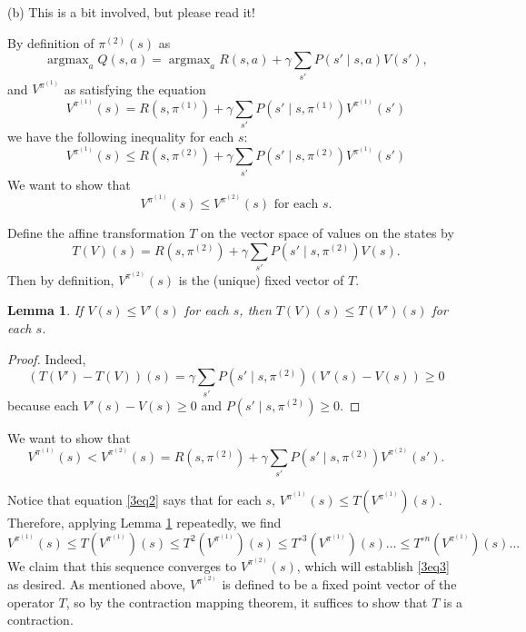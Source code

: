 \documentclass[12pt]{article}
\DeclareMathOperator{\argmax}{argmax}
\newtheorem{lemma}[thm]{Lemma}
\theoremstyle{remark}
\begin{document}
\noindent (b) This is a bit involved, but please read it!

By definition of $\pi^{(2)}(s)$ as 
\[
\argmax_a Q(s,a) = \argmax_a R(s,a) + \gamma \sum_{s'} P(s' \mid s,a) V(s'),
\]
and $V^{\pi^{(1)}}$ as satisfying the equation 
\[
V^{\pi^{(1)}} (s) = R(s, \pi^{(1)}) + \gamma \sum_{s'} P(s' \mid s, \pi^{(1)} ) V^{\pi^{(1)}}(s')
\]
we have the following inequality for each $s$:
\begin{equation}\label{3eq2}
V^{\pi^{(1)}} (s) \leq R(s, \pi^{(2)}) + \gamma \sum_{s'} P(s' \mid s, \pi^{(2)} ) V^{\pi^{(1)}}(s') 
\end{equation}
We want to show that 
\begin{equation}\label{3eq3}
V^{\pi^{(1)}}(s) \leq V^{\pi^{(2)}}(s) \text{ for each }s.
\end{equation}



Define the affine transformation $T$ on the vector space of values on the states by 
\[
T(V)(s) =  R(s, \pi^{(2)}) + \gamma \sum_{s'} P(s' \mid s, \pi^{(2)} ) V(s).
\]
Then by definition, $V^{\pi^{(2)}}(s)$ is the (unique) fixed vector of $T$. 

\begin{lemma}\label{3lem1}
If $V(s) \leq V'(s)$ for each $s$, then $T(V)(s) \leq T(V')(s)$ for each $s$. 
\end{lemma}

\begin{proof}
Indeed, 
\[
(T(V')-T(V))(s) = \gamma \sum_{s'} P(s' \mid s, \pi^{(2)}) (V'(s) - V(s)) \geq 0
\]
because each $V'(s)-V(s) \geq 0$ and $P(s' \mid s, \pi^{(2)}) \geq 0$. 
\end{proof}

We want to show that 
\begin{equation}\label{3eq2}
V^{\pi^{(1)}}(s)  < V^{\pi^{(2)}} (s)  = R(s, \pi^{(2)}) + \gamma \sum_{s'} P(s' \mid s, \pi^{(2)} ) V^{\pi^{(2)}}(s'). 
\end{equation}

Notice that equation \eqref{3eq2} says that for each $s$, $V^{\pi^{(1)}}(s) \leq T(V^{\pi^{(1)}})(s)$. Therefore, applying Lemma \ref{3lem1} repeatedly, we find 
\[
V^{\pi^{(1)}}(s) \leq T(V^{\pi^{(1)}})(s) \leq T^2(V^{\pi^{(1)}})(s) \leq T^{\circ 3}(V^{\pi^{(1)}})(s) \ldots \leq T^{\circ n}(V^{\pi^{(1)}})(s) \ldots
\]
We claim that this sequence converges to $V^{\pi^{(2)}}(s)$, which will establish \eqref{3eq3} as desired. As mentioned above, $V^{\pi^{(2)}}$ is defined to be a fixed point vector of the operator $T$, so by the contraction mapping theorem, it suffices to show that $T$ is a contraction.
\end{document}

